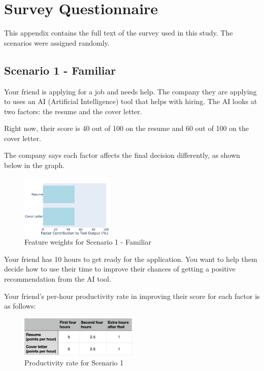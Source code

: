 \section{Survey Questionnaire}\label{sec:app-survey}

This appendix contains the full text of the survey used in this study. The scenarios were assigned randomly. 

\subsection{Scenario 1 - Familiar}
Your friend is applying for a job and needs help. The company they are applying to uses an AI (Artificial Intelligence) tool that helps with hiring. The AI looks at two factors: the resume and the cover letter.

Right now, their score is 40 out of 100 on the resume and 60 out of 100 on the cover letter.

The company says each factor affects the final decision differently, as shown below in the graph.
\begin{figure}[ht]
    \centering
    \includegraphics[width=0.4\textwidth]{Figures/2-equal.png}
    \caption{Feature weights for Scenario 1 - Familiar}
    \label{fig:survey-weights-scenario1}
\end{figure}

Your friend has 10 hours to get ready for the application. You want to help them decide how to use their time to improve their chances of getting a positive recommendation from the AI tool.

Your friend’s per-hour productivity rate in improving their score for each factor is as follows:
\begin{figure}[ht]
    \centering
    \includegraphics[width=0.5\textwidth]{Figures/cost-two.png}
    \caption{Productivity rate for Scenario 1}
    \label{fig:survey-cost-scenario1}
\end{figure}


